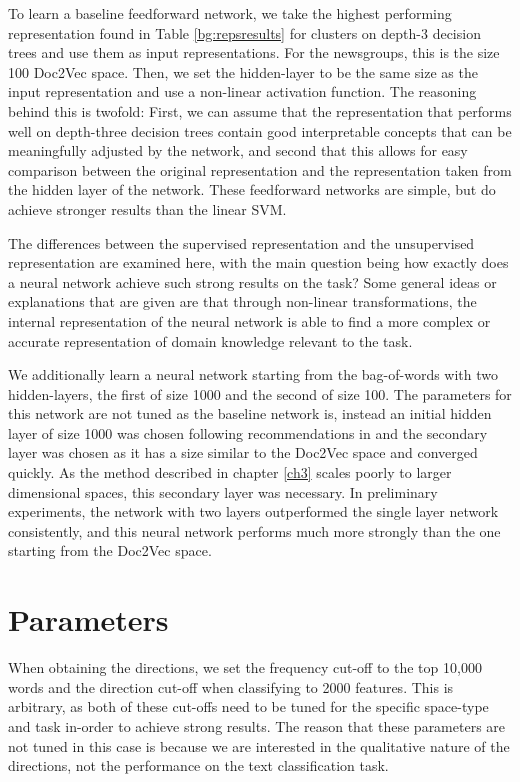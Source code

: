To learn a baseline feedforward network, we take the highest performing representation found in Table \ref{bg:repsresults} for clusters on depth-3 decision trees and use them as input representations.   For the newsgroups, this is the size 100 Doc2Vec space. Then, we set the hidden-layer to be the same size as the input representation and use a non-linear activation function.  The reasoning behind this is twofold: First, we can assume that the representation that performs well on depth-three decision trees contain good interpretable concepts that can be meaningfully adjusted by the network, and second that this allows for easy comparison between the original representation and the representation taken from the hidden layer of the network. These feedforward networks are simple, but do achieve stronger results than the linear SVM.  

The  differences between the supervised representation and the unsupervised representation are examined here, with the main question being how exactly does a neural network achieve such strong results on the task? Some general ideas or explanations that are given are that through non-linear transformations, the internal representation of the neural network is able to find a more complex or accurate representation of domain knowledge relevant to the task.


We additionally learn a neural network starting from the bag-of-words  with two hidden-layers, the first of size 1000 and the second of size 100. The parameters for this network are not tuned as the baseline network is, instead an initial hidden layer of size 1000 was chosen following recommendations in \cite{Nam2014a} and the secondary layer was chosen as it has a size similar to the Doc2Vec space and converged quickly. As the method described in chapter \ref{ch3} scales poorly to larger dimensional spaces, this secondary layer was necessary. In preliminary experiments, the network with two layers outperformed the single layer network consistently, and this neural network performs much more strongly than the one starting from the Doc2Vec space. 




\section{Parameters}

When obtaining the directions, we set the frequency cut-off to the top 10,000 words and the direction cut-off when classifying to 2000 features. This is arbitrary, as both of these cut-offs need to be tuned for the specific space-type and task in-order to achieve strong results. The reason that these parameters are not tuned in this case is because we are interested in the qualitative nature of the directions, not the performance on the text classification task. 

